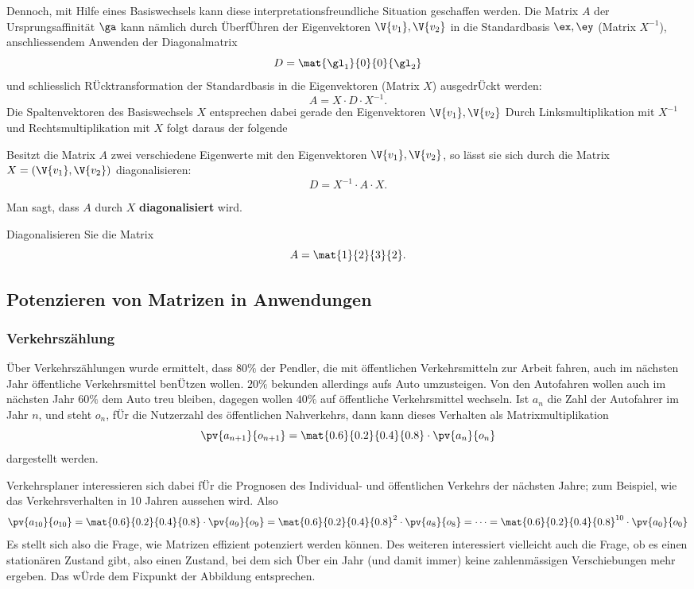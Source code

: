 \documentclass[%
11pt,%
twoside,%
titlepage,%
german,%
headsepline%
]{scrartcl}
\begin{document}
Dennoch, mit Hilfe eines Basiswechsels kann diese interpretationsfreundliche Situation geschaffen werden. Die Matrix $A$ der Ursprungsaffinität $\ga$ kann nämlich durch \"Uberf\"Uhren der Eigenvektoren $\V{v_1}, \V{v_2}$ in die Standardbasis $\ex, \ey$ (Matrix $X^{-1}$), anschliessendem Anwenden der Diagonalmatrix
$$D=\mat{\gl_1}{0}{0}{\gl_2}$$
und schliesslich R\"Ucktransformation der
Standardbasis in die Eigenvektoren (Matrix $X$) ausgedr\"Uckt werden:
$$A=X\cdot D\cdot X^{-1}.$$
Die Spaltenvektoren des Basiswechsels $X$ entsprechen dabei gerade den Eigenvektoren $\V{v_1}, \V{v_2}$ Durch Linksmultiplikation mit $X^{-1}$ und Rechtsmultiplikation mit $X$ folgt daraus der folgende

\begin{satz}
Besitzt die Matrix $A$ zwei verschiedene Eigenwerte mit den Eigenvektoren $\V{v_1}, \V{v_2}$, so lässt sie sich durch die Matrix $X=(\V{v_1}, \V{v_2})$ diagonalisieren:
$$D=X^{-1}\cdot A\cdot X.$$
\end{satz}

Man sagt, dass $A$ durch $X$ \textbf{diagonalisiert} wird.

\begin{ueb}
Diagonalisieren Sie die Matrix
$$A=\mat{1}{2}{3}{2}.$$
\end{ueb}

\subsection{Potenzieren von Matrizen in Anwendungen}

\subsubsection{Verkehrszählung}

\begin{bsp}
\"Uber Verkehrszählungen wurde ermittelt, dass $80\%$ der Pendler, die mit öffentlichen Verkehrsmitteln zur Arbeit fahren, auch im nächsten Jahr öffentliche Verkehrsmittel ben\"Utzen wollen. $20\%$ bekunden allerdings aufs Auto umzusteigen. Von den Autofahren wollen auch im nächsten Jahr $60\%$ dem Auto treu bleiben, dagegen wollen $40\%$ auf öffentliche Verkehrsmittel wechseln. Ist $a_n$ die Zahl der Autofahrer im Jahr $n$, und steht $o_n$, f\"Ur die Nutzerzahl des öffentlichen Nahverkehrs, dann kann dieses Verhalten als Matrixmultiplikation
$$\pv{a_{n+1}}{o_{n+1}}=\mat{0.6}{0.2}{0.4}{0.8}\cdot\pv{a_n}{o_n}$$
dargestellt werden.

Verkehrsplaner interessieren sich dabei f\"Ur die Prognosen des Individual- und öffentlichen Verkehrs der nächsten Jahre; zum Beispiel, wie das Verkehrsverhalten in 10 Jahren aussehen wird. Also
$$
\pv{a_{10}}{o_{10}}=\mat{0.6}{0.2}{0.4}{0.8}\cdot\pv{a_9}{o_9}=\mat{0.6}{0.2}{0.4}{0.8}^2\cdot\pv{a_8}{o_8}=\dots=\mat{0.6}{0.2}{0.4}{0.8}^{10}\cdot\pv{a_0}{o_0}
$$
Es stellt sich also die Frage, wie Matrizen effizient potenziert werden können. Des weiteren interessiert vielleicht auch die Frage, ob es einen stationären Zustand gibt, also einen Zustand, bei dem sich \"Uber ein Jahr (und damit immer) keine zahlenmässigen Verschiebungen mehr ergeben. Das w\"Urde dem Fixpunkt der Abbildung entsprechen.
\end{bsp}
\end{document}
